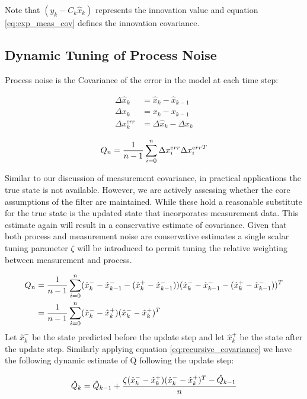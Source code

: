 \documentclass[a4paper]{article}
\begin{document}
	Note that $(y_k - C_k \hat{x}_k)$ represents the innovation value and equation \ref{eq:exp_meas_cov} defines the innovation covariance.

	\subsection{Dynamic Tuning of Process Noise}

	Process noise is the Covariance of the error in the model at each time step:

	\begin{align*}
		\Delta \hat{x}_k &= \hat{x}_k - \hat{x}_{k-1}\\
		\Delta x_k &= x_k - x_{k-1}\\
		\Delta x_k^{err} &= \Delta \hat{x}_k - \Delta x_k
	\end{align*}

	\begin{equation}
		Q_n = {1 \over n - 1} \displaystyle\sum_{i=0} ^{n} \Delta x_i^{err} {\Delta x_i^{err}}^T
	\end{equation}

	Similar to our discussion of measurement covariance, in practical applications the true state is not available. However, we are actively assessing whether the core assumptions of the filter are maintained. While these hold a reasonable substitute for the true state is the updated state that incorporates measurement data. This estimate again will result in a conservative estimate of covariance. Given that both process and measurement noise are conservative estimates a single scalar tuning parameter $\zeta$ will be introduced to permit tuning the relative weighting between measurement and process.

	\begin{align*}
		Q_n &= {1 \over n - 1} \displaystyle\sum_{i=0} ^{n}(\hat{x}_k^- - \hat{x}_{k-1}^- - (\hat{x}_k^+ - \hat{x}_{k-1}^-))(\hat{x}_k^- - \hat{x}_{k-1}^- - (\hat{x}_k^+ - \hat{x}_{k-1}^-))^T\\
		&= {1 \over n - 1} \displaystyle\sum_{i=0} ^{n}(\hat{x}_k^- - \hat{x}_k^+)(\hat{x}_k^- - \hat{x}_k^+)^T\\
	\end{align*}
	Let $\hat{x}_k^-$ be the state predicted before the update step and let $\hat{x}_k^+$ be the state after the update step. Similarly applying equation \ref{eq:recursive_covariance} we have the following dynamic estimate of Q following the update step:

	\begin{equation}
	\hat{Q}_k = \hat{Q}_{k-1} + {\zeta (\hat{x}_k^- - \hat{x}_k^+)(\hat{x}_k^- - \hat{x}_k^+)^T - \hat{Q}_{k-1} \over n}
	\end{equation}
\end{document}
